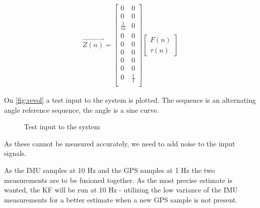 \begin{align}
\vec{Z(n)} = \begin{bmatrix}
0 & 0\\
0 & 0\\
\frac{1}{m} & 0\\
0 & 0\\
0 & 0\\
0 & 0\\
0 & 0\\
0 & 0\\
0 & \frac{1}{I}\\
\end{bmatrix}\begin{bmatrix}
F(n)\\
\tau(n)
\end{bmatrix}
\end{align}



On \vref{fig:revol} a test input to the system is plotted. The sequence is an alternating angle reference sequence, the angle is a sine curve. 
\begin{figure}[htbp]
	\centering
	\caption{Test input to the system}
	\label{fig:revol}
\end{figure}

As these cannot be measured accurately, we need to add noise to the input signals.

As the \ac{IMU} samples at 10 Hz and the \ac{GPS} samples at 1 Hz the two measurements are to be fusioned together. As the most precise estimate is wanted, the \ac{KF} will be run at 10 Hz - utilizing the low variance of the \ac{IMU} measurements for a better estimate when a new \ac{GPS} sample is not present. 

